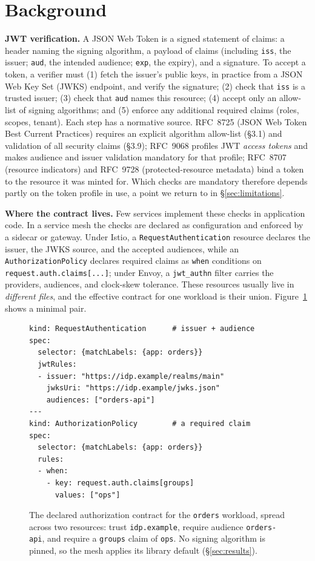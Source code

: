 \section{Background}\label{sec:background}

\noindent\textbf{JWT verification.} A JSON Web Token is a signed statement of
claims: a header naming the signing algorithm, a payload of claims (including
\texttt{iss}, the issuer; \texttt{aud}, the intended audience; \texttt{exp}, the
expiry), and a signature. To accept a token, a verifier must (1) fetch the issuer's
public keys, in practice from a JSON Web Key Set (JWKS) endpoint, and verify the
signature; (2) check that \texttt{iss} is a trusted issuer; (3) check that
\texttt{aud} names this resource; (4) accept only an allow-list of signing
algorithms; and (5) enforce any additional required claims (roles, scopes, tenant).
Each step has a normative source. RFC~8725 (JSON Web Token Best Current Practices)
requires an explicit algorithm allow-list (\S3.1) and validation of all security
claims (\S3.9); RFC~9068 profiles JWT \emph{access tokens} and makes audience and
issuer validation mandatory for that profile; RFC~8707 (resource indicators) and
RFC~9728 (protected-resource metadata) bind a token to the resource it was minted
for. Which checks are mandatory therefore depends partly on the token profile in
use, a point we return to in \S\ref{sec:limitations}.

\noindent\textbf{Where the contract lives.} Few services implement these checks in
application code. In a service mesh the checks are declared as configuration and
enforced by a sidecar or gateway. Under Istio, a \texttt{RequestAuthentication}
resource declares the issuer, the JWKS source, and the accepted audiences, while an
\texttt{AuthorizationPolicy} declares required claims as \texttt{when} conditions on
\texttt{request.auth.claims[...]}; under Envoy, a \texttt{jwt\_authn} filter carries
the providers, audiences, and clock-skew tolerance. These resources usually live in
\emph{different files}, and the effective contract for one workload is their union.
Figure~\ref{fig:example} shows a minimal pair.

\begin{figure}[t]
\footnotesize
\begin{verbatim}
kind: RequestAuthentication      # issuer + audience
spec:
  selector: {matchLabels: {app: orders}}
  jwtRules:
  - issuer: "https://idp.example/realms/main"
    jwksUri: "https://idp.example/jwks.json"
    audiences: ["orders-api"]
---
kind: AuthorizationPolicy        # a required claim
spec:
  selector: {matchLabels: {app: orders}}
  rules:
  - when:
    - key: request.auth.claims[groups]
      values: ["ops"]
\end{verbatim}
\caption{The declared authorization contract for the \texttt{orders} workload,
spread across two resources: trust \texttt{idp.example}, require audience
\texttt{orders-api}, and require a \texttt{groups} claim of \texttt{ops}. No signing
algorithm is pinned, so the mesh applies its library default (\S\ref{sec:results}).}
\label{fig:example}
\end{figure}

